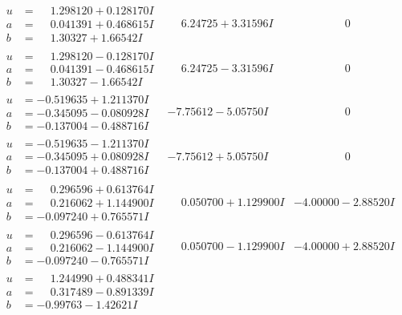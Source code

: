 \documentclass[1p]{elsarticle_modified}
\theoremstyle{definition}
\begin{document}
$$\begin{array}{c|c|c}
\begin{aligned}
u &= \phantom{-}1.298120 + 0.128170 I \\
a &= \phantom{-}0.041391 + 0.468615 I \\
b &= \phantom{-}1.30327 + 1.66542 I\end{aligned}
 & \phantom{-}6.24725 + 3.31596 I & \phantom{-0.000000 } 0 \\ \hline\begin{aligned}
u &= \phantom{-}1.298120 - 0.128170 I \\
a &= \phantom{-}0.041391 - 0.468615 I \\
b &= \phantom{-}1.30327 - 1.66542 I\end{aligned}
 & \phantom{-}6.24725 - 3.31596 I & \phantom{-0.000000 } 0 \\ \hline\begin{aligned}
u &= -0.519635 + 1.211370 I \\
a &= -0.345095 - 0.080928 I \\
b &= -0.137004 - 0.488716 I\end{aligned}
 & -7.75612 - 5.05750 I & \phantom{-0.000000 } 0 \\ \hline\begin{aligned}
u &= -0.519635 - 1.211370 I \\
a &= -0.345095 + 0.080928 I \\
b &= -0.137004 + 0.488716 I\end{aligned}
 & -7.75612 + 5.05750 I & \phantom{-0.000000 } 0 \\ \hline\begin{aligned}
u &= \phantom{-}0.296596 + 0.613764 I \\
a &= \phantom{-}0.216062 + 1.144900 I \\
b &= -0.097240 + 0.765571 I\end{aligned}
 & \phantom{-}0.050700 + 1.129900 I & -4.00000 - 2.88520 I \\ \hline\begin{aligned}
u &= \phantom{-}0.296596 - 0.613764 I \\
a &= \phantom{-}0.216062 - 1.144900 I \\
b &= -0.097240 - 0.765571 I\end{aligned}
 & \phantom{-}0.050700 - 1.129900 I & -4.00000 + 2.88520 I \\ \hline\begin{aligned}
u &= \phantom{-}1.244990 + 0.488341 I \\
a &= \phantom{-}0.317489 - 0.891339 I \\
b &= -0.99763 - 1.42621 I\end{aligned}

\end{array}$$
\end{document}
